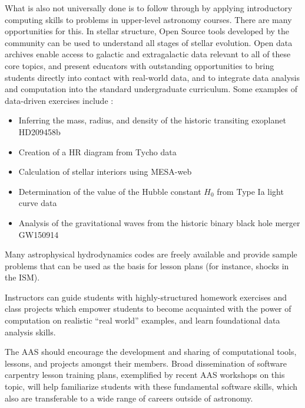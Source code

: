 \documentclass[11pt]{article}
\newenvironment{squishlist}                                                     
  {\begin{itemize}                                                              
    \addtolength{\itemsep}{-0.33\baselineskip}                                  
   }                                                                            
  { \end{itemize} }
\begin{document}
What is also not universally done is to follow through by
applying introductory computing skills to problems in upper-level astronomy
courses.  There are many opportunities for this.  In stellar
structure, Open Source tools developed by the community can be used to
understand all stages of stellar evolution. Open data archives enable
access to galactic and extragalactic data relevant to all of these
core topics, and present educators with outstanding opportunities to
bring students directly into contact with real-world data, and to
integrate data analysis and computation into the standard
undergraduate curriculum. Some examples of data-driven exercises
include :
\begin {squishlist}

\item Inferring the mass, radius, and density of the historic transiting exoplanet HD209458b

\item Creation of a HR diagram from Tycho data

\item Calculation of stellar interiors using MESA-web

\item Determination of the value of the Hubble constant $H_0$ from Type Ia light curve data

\item Analysis of the gravitational waves from the historic binary black hole merger GW150914

\end {squishlist}

Many astrophysical hydrodynamics codes are freely available and
provide sample problems that can be used as the basis for lesson
plans (for instance, shocks in the ISM).

Instructors can guide students with highly-structured homework
exercises and class projects which empower students to become
acquainted with the power of computation on realistic ``real world''
examples, and learn foundational data analysis skills.

The AAS should encourage the development and sharing of computational
tools, lessons, and projects amongst their members. Broad
dissemination of software carpentry lesson training plans, exemplified
by recent AAS workshops on this topic, will help familiarize students
with these fundamental software skills, which also are transferable to
a wide range of careers outside of astronomy.
\end{document}
